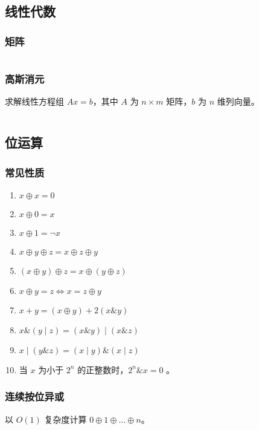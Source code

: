 \documentclass[a4paper, twoside]{article}
\begin{document}
\subsection{线性代数}
    \subsubsection{矩阵}
    \inputminted{cpp}{../src/数学/矩阵.cpp}

    \subsubsection{高斯消元}
    求解线性方程组 $Ax = b$，其中 $A$ 为 $n \times m$ 矩阵，$b$ 为 $n$ 维列向量。
    \inputminted{cpp}{../src/数学/高斯消元.cpp}

\subsection{位运算}
    \subsubsection{常见性质}
    \begin{enumerate}
        \item $x \oplus x = 0$
        \item $x \oplus 0 = x$
        \item $x \oplus 1 = \neg x $
        \item $x \oplus y \oplus z = x \oplus z \oplus y$
        \item $(x \oplus y) \oplus z = x \oplus (y \oplus z)$
        \item $x \oplus y = z \Leftrightarrow x = z \oplus y$
        \item $x + y = (x \oplus y) + 2(x \mathrel{\&} y)$
        \item $x \mathrel{\&} (y \mid z) = (x \mathrel{\&} y) \mid (x \mathrel{\&} z)$
        \item $x \mid (y \mathrel{\&} z) = (x \mid y) \mathrel{\&} (x \mid z)$
        \item 当 $x$ 为小于 $2^{n}$ 的正整数时，$2^{n} \mathrel{\&} x=0$ 。
    \end{enumerate} 

    \subsubsection{连续按位异或}
    以 $O(1)$ 复杂度计算 $0 \oplus 1 \oplus \dots \oplus n$。
    \inputminted{cpp}{../src/数学/连续按位异或.cpp}
\end{document}

